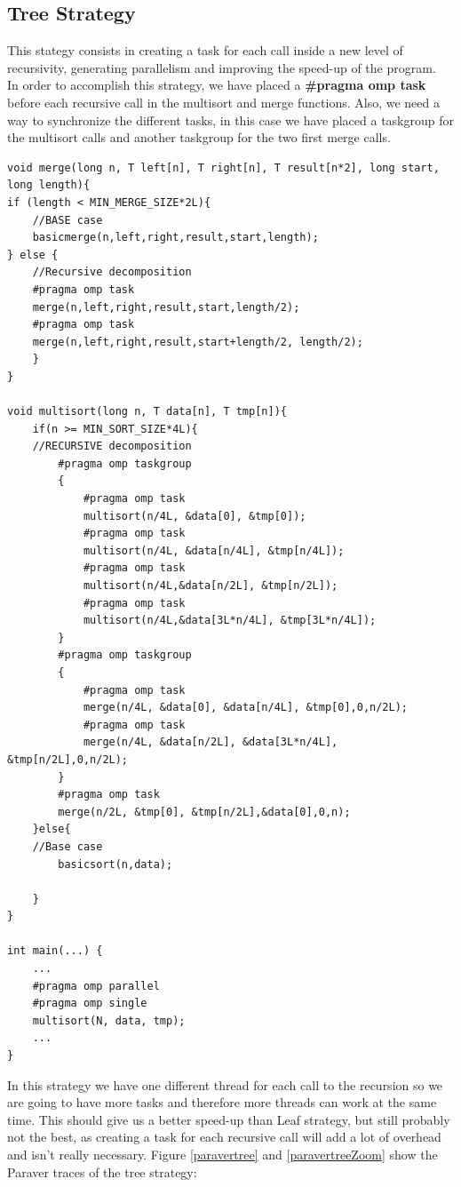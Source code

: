 \documentclass[12]{article}
\begin{document}
\subsection{Tree Strategy}
This stategy consists in creating a task for each call inside a new level of recursivity, generating parallelism and improving the speed-up of the program. 
\\
In order to accomplish this strategy, we have placed a \textbf{#pragma omp task} before each recursive call in the multisort and merge functions. Also, we need a way to synchronize the different tasks, in this case we have placed a taskgroup for the multisort calls and another taskgroup for the two first merge calls.
\\
\medskip
\begin{lstlisting}[frame=single]
void merge(long n, T left[n], T right[n], T result[n*2], long start, long length){
if (length < MIN_MERGE_SIZE*2L){
    //BASE case
    basicmerge(n,left,right,result,start,length);
} else {
    //Recursive decomposition
    #pragma omp task
    merge(n,left,right,result,start,length/2);
    #pragma omp task
    merge(n,left,right,result,start+length/2, length/2);
    }
}

void multisort(long n, T data[n], T tmp[n]){
    if(n >= MIN_SORT_SIZE*4L){
    //RECURSIVE decomposition
        #pragma omp taskgroup
        {
            #pragma omp task
            multisort(n/4L, &data[0], &tmp[0]);
            #pragma omp task
            multisort(n/4L, &data[n/4L], &tmp[n/4L]);
            #pragma omp task
            multisort(n/4L,&data[n/2L], &tmp[n/2L]);
            #pragma omp task
            multisort(n/4L,&data[3L*n/4L], &tmp[3L*n/4L]);
        }
        #pragma omp taskgroup
        {
            #pragma omp task
            merge(n/4L, &data[0], &data[n/4L], &tmp[0],0,n/2L);
            #pragma omp task
            merge(n/4L, &data[n/2L], &data[3L*n/4L], &tmp[n/2L],0,n/2L);
        }
        #pragma omp task
        merge(n/2L, &tmp[0], &tmp[n/2L],&data[0],0,n);
    }else{
    //Base case
        basicsort(n,data);    
    
    }
}

int main(...) {
    ...
    #pragma omp parallel
    #pragma omp single
    multisort(N, data, tmp);
    ...
}
\end{lstlisting}
\medskip
In this strategy we have one different thread for each call to the recursion so we are going to have more tasks and therefore more threads can work at the same time. This should give us a better speed-up than Leaf strategy, but still probably not the best, as creating a task for each recursive call will add a lot of overhead and isn't really necessary. Figure \ref{paravertree} and \ref{paravertreeZoom} show the Paraver traces of the tree strategy:
\end{document}
